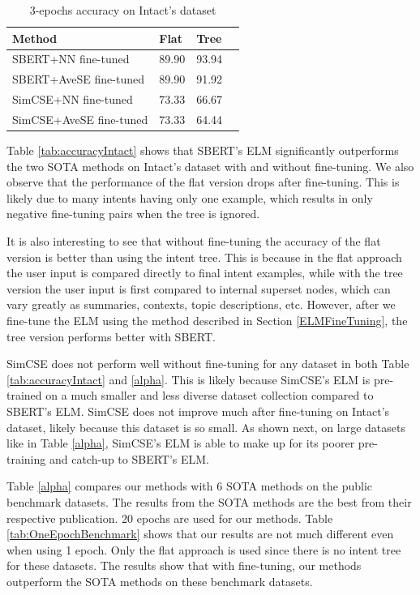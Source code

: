 \documentclass[sigconf, anonymous=true]{acmart}
\begin{document}
\begin{table}[h]
\setlength{} %
\footnotesize\centering
\begin{tabular}{llll}
\hline \textbf{Method} & \textbf{Flat} & \textbf{Tree} \\
\hline SBERT+NN fine-tuned & 89.90 & 93.94  \\
SBERT+AveSE fine-tuned & 89.90 & 91.92  \\
SimCSE+NN fine-tuned & 73.33 & 66.67  \\
SimCSE+AveSE fine-tuned & 73.33 & 64.44  \\
\hline
\end{tabular}
\caption{3-epochs accuracy on Intact's dataset}
\label{tab:threeEpoch}
\end{table}

Table \ref{tab:accuracyIntact} shows that SBERT's ELM significantly outperforms the two SOTA methods on Intact's dataset with and without fine-tuning. We also observe that the performance of the flat version drops after fine-tuning. This is likely due to many intents having only one example, which results in only negative fine-tuning pairs when the tree is ignored. 

It is also interesting to see that without fine-tuning the accuracy of the flat version is better than using the intent tree. This is because in the flat approach the user input is compared directly to final intent examples, while with the tree version the user input is first compared to internal superset nodes, which can vary greatly as summaries, contexts, topic descriptions, etc. However, after we fine-tune the ELM using the method described in Section \ref{ELMFineTuning}, the tree version performs better with SBERT. 

SimCSE does not perform well without fine-tuning for any dataset in both Table \ref{tab:accuracyIntact} and \ref{alpha}. This is likely because SimCSE's ELM is pre-trained on a much smaller and less diverse dataset collection compared to SBERT's ELM. SimCSE does not improve much after fine-tuning on Intact's dataset, likely because this dataset is so small. As shown next, on large datasets like in Table \ref{alpha}, SimCSE's ELM is able to make up for its poorer pre-training and catch-up to SBERT's ELM.   

Table \ref{alpha} compares our methods with 6 SOTA methods on the public benchmark datasets. The results from the SOTA methods are the best from their respective publication. 20 epochs are used for our methods. Table \ref{tab:OneEpochBenchmark} shows that our results are not much different even when using 1 epoch. Only the flat approach is used since there is no intent tree for these datasets. The results show that with fine-tuning, our methods outperform the SOTA methods on these benchmark datasets.   
\end{document}
